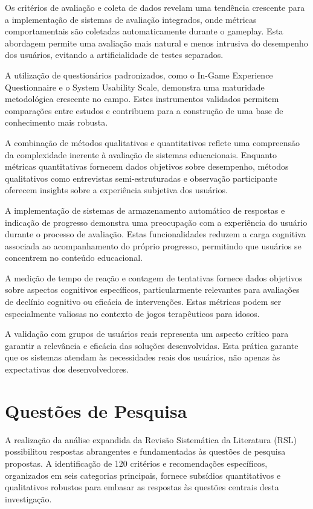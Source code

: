 \begin{table}[H]
Os critérios de avaliação e coleta de dados revelam uma tendência crescente para a implementação de sistemas de avaliação integrados, onde métricas comportamentais são coletadas automaticamente durante o gameplay. Esta abordagem permite uma avaliação mais natural e menos intrusiva do desempenho dos usuários, evitando a artificialidade de testes separados.

A utilização de questionários padronizados, como o In-Game Experience Questionnaire e o System Usability Scale, demonstra uma maturidade metodológica crescente no campo. Estes instrumentos validados permitem comparações entre estudos e contribuem para a construção de uma base de conhecimento mais robusta.

A combinação de métodos qualitativos e quantitativos reflete uma compreensão da complexidade inerente à avaliação de sistemas educacionais. Enquanto métricas quantitativas fornecem dados objetivos sobre desempenho, métodos qualitativos como entrevistas semi-estruturadas e observação participante oferecem insights sobre a experiência subjetiva dos usuários.

A implementação de sistemas de armazenamento automático de respostas e indicação de progresso demonstra uma preocupação com a experiência do usuário durante o processo de avaliação. Estas funcionalidades reduzem a carga cognitiva associada ao acompanhamento do próprio progresso, permitindo que usuários se concentrem no conteúdo educacional.

A medição de tempo de reação e contagem de tentativas fornece dados objetivos sobre aspectos cognitivos específicos, particularmente relevantes para avaliações de declínio cognitivo ou eficácia de intervenções. Estas métricas podem ser especialmente valiosas no contexto de jogos terapêuticos para idosos.

A validação com grupos de usuários reais representa um aspecto crítico para garantir a relevância e eficácia das soluções desenvolvidas. Esta prática garante que os sistemas atendam às necessidades reais dos usuários, não apenas às expectativas dos desenvolvedores.


\section{Questões de Pesquisa}
\label{sec:qp_expandida}

A realização da análise expandida da Revisão Sistemática da Literatura (RSL) possibilitou respostas abrangentes e fundamentadas às questões de pesquisa propostas. A identificação de 120 critérios e recomendações específicos, organizados em seis categorias principais, fornece subsídios quantitativos e qualitativos robustos para embasar as respostas às questões centrais desta investigação.


\end{table}
